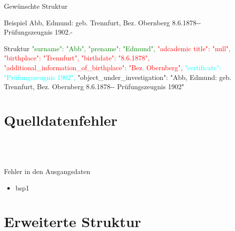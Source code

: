 \documentclass[12pt]{beamer}
\begin{document}
\begin{large}
\begin{frame}{Gewünschte Struktur}
 \begin{block}{Beispiel}
  \small
  Abb, Edmund: geb. Trennfurt, Bez. Obernberg 8.6.1878-{}- Prüfungszeugnis 1902.-
 \end{block}

 \begin{block}{Struktur}
  \small
  \textcolor{green}{"{}surname"{}: "{}Abb"{},}
  \newline
  \textcolor{green}{"{}prename"{}: "{}Edmund"{},}
  \newline 
  \textcolor{red}{"{}adcademic title"{}: "{}null"{},}
  \newline 
  \textcolor{red}{"{}birthplace"{}: "{}Trennfurt"{},}
  \newline
  \textcolor{red}{"{}birthdate"{}: "{}8.6.1878"{},}
  \newline
  \textcolor{red}{"{}additional\_information\_of\_birthplace"{}: "{}Bez. Obernberg"{},}
  \newline
  \textcolor{cyan}{"{}certificate"{}: "{}Prüfungszeugnis 1902"{},}
  \newline
  "{}object\_under\_investigation"{}: "{}Abb, Edmund: geb. Trennfurt, Bez. Obernberg 8.6.1878-{}- Prüfungszeugnis 1902"{}
 \end{block} 
\end{frame}




\section{Quelldatenfehler}
 \subsection*{~}
\begin{frame}{Fehler in den Ausgangsdaten}
 \begin{itemize}
  \item bsp1
  
 \end{itemize}
\end{frame}

\section{Erweiterte Struktur}
 \subsection*{~}


\end{large}
\end{document}
